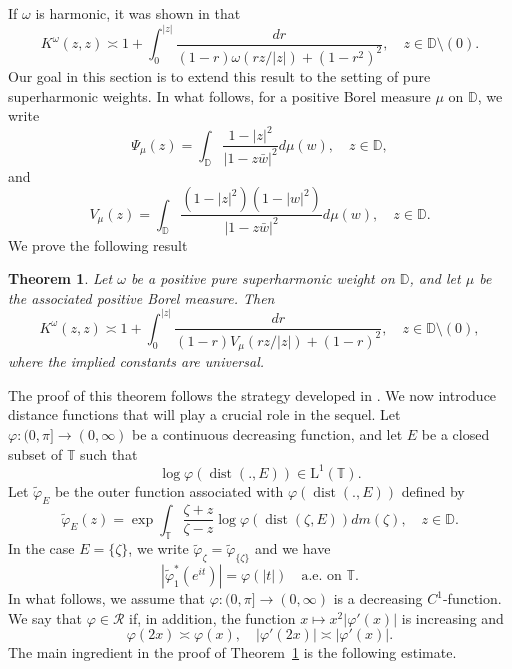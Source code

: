 \documentclass[12pt,reqno,a4paper]{amsart}
\newtheorem{theo}[prop]{Theorem}
\newcommand\TT{\mathbb{T}}
\newcommand\DD{\mathbb{D}}
\newcommand{\cR}{{\mathcal{R}}}
\DeclareMathOperator{\dist}{dist}
\numberwithin{equation}{section}
\begin{document}
If  $\omega $ is harmonic, it was shown in \cite{EEK18} that 
$$
K^\omega(z, z) \asymp 1+ \displaystyle \int _0^{|z|}\frac{dr}{(1-r)\omega(rz/|z|)+(1-r^2)^2},\quad z\in\DD \setminus (0).
$$
Our goal in this section is to extend this result to the setting of  pure superharmonic weights. In what follows, for a positive Borel measure $\mu$ on $\DD$, we write 
$$
\Psi _\mu (z)= \displaystyle \int _\DD\frac{1-|z|^2}{|1-z\bar{w}|^2}d\mu(w),\quad z\in \DD,
$$
and 
$$
V_\mu(z) =\displaystyle \int _\DD\frac{(1-|z|^2)(1-|w|^2)}{|1-z\bar{w}|^2}d\mu(w),\quad z\in \DD.
$$
We  prove the following result
\begin{theo}\label{kernel}
	Let $\omega$ be a positive  pure superharmonic  weight on $\DD$, and let $\mu$ be the associated positive Borel measure.
	Then 
	$$
	K^\omega(z, z) \asymp 1+ \displaystyle \int _0^{|z|}\frac{dr}{(1-r)V_\mu(rz/|z|)+(1-r)^2},\quad z\in\DD \setminus (0),
	$$
	where the implied constants are universal.	
\end{theo}
The proof of this theorem follows the strategy developed in \cite{EEK18}. We now introduce distance functions that will play a crucial role in the sequel. Let $\varphi : (0,\pi] \to (0,\infty)$ be a continuous decreasing function, and let $E$ be a closed subset of $\TT$ such that
$$
\log \varphi( \dist(.,E)) \in \mathrm{L}^1(\TT).
$$
Let $\tilde {\varphi}_E$ be the outer function associated with $\varphi( \dist(.,E))$ defined by
$$
\tilde {\varphi}_E(z)= \exp \displaystyle \int _\TT\frac {\zeta+z}{\zeta-z}\log \varphi( \dist(\zeta, E))dm(\zeta),\quad z\in \DD.
$$
In the case $E= \{\zeta\}$, we write $\tilde{\varphi}_{\zeta} = \tilde{\varphi}_{\{\zeta\}}$  and we have 
$$|\tilde{\varphi}^*_{1}(e^{it})| = \varphi(|t|) \quad \text{a.e. on } \TT.$$
In what follows, we assume that $\varphi : (0,\pi] \to (0,\infty)$ is a decreasing $C^1$-function. We say that $\varphi \in \mathcal{R}$ if, in addition, the function $x \mapsto x^2 \vert\varphi'(x)\vert$ is increasing and
\begin{equation}\label{funct-doub}
	\varphi(2x) \asymp \varphi(x), \quad \vert\varphi'(2x)\vert \asymp \vert\varphi'(x)\vert.
\end{equation}
The main ingredient in the proof of Theorem~\ref{kernel} is the following estimate.
\end{document}
